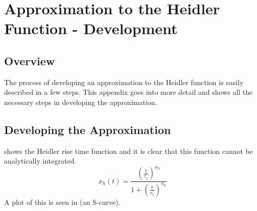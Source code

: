 
\chapter{Approximation to the Heidler Function - Development} %

\label{AppendixDev} %



\section{Overview}
\label{sec:app_dev_overview}
The process of developing an approximation to the Heidler function is easily described in a few steps. This appendix goes into more detail and shows all the necessary steps in developing the approximation.


\section{Developing the Approximation}
\label{sec:app_dev_developing_the_approximation}
 shows the Heidler rise time function and it is clear that this function cannot be analytically integrated.
\begin{equation}
    x_h \left( t \right) = \frac{{\left (\frac{t}{\tau_1} \right )}^{n_h}}{1 + {\left (\frac{t}{\tau_1} \right )}^{n_h}}
    \label{eqn:app_HFrise}
\end{equation}
A plot of this is seen in  (an S-curve).

